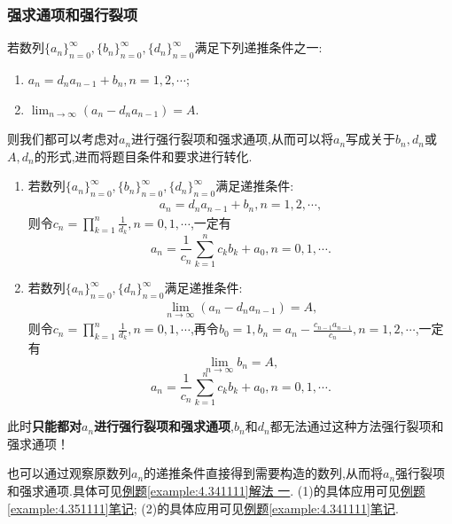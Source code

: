 \documentclass[../../main.tex]{subfiles}%
\begin{document}
\subsubsection{强求通项和强行裂项}

若数列\(\{ a_n \}_{n = 0}^{\infty}, \{ b_n \}_{n = 0}^{\infty}, \{ d_n \}_{n = 0}^{\infty}\)满足下列递推条件之一:
\begin{enumerate}
\item \(a_n = d_na_{n - 1} + b_n, n = 1, 2, \cdots\);
\item \(\lim_{n\rightarrow \infty}(a_n - d_na_{n - 1}) = A\).
\end{enumerate}
则我们都可以考虑对\(a_n\)进行强行裂项和强求通项,从而可以将\(a_n\)写成关于\(b_n, d_n\)或\(A, d_n\)的形式,进而将题目条件和要求进行转化.


\begin{proposition}[强求通项和强行裂项]\label{proposition:强求通项和强行裂项}
\begin{enumerate}[(1)]
\item 若数列\(\{ a_n \}_{n = 0}^{\infty}, \{ b_n \}_{n = 0}^{\infty}, \{ d_n \}_{n = 0}^{\infty}\)满足递推条件:
\begin{align}\label{proposition4.8-0.1}
a_n = d_na_{n - 1} + b_n, n = 1, 2, \cdots,  
\end{align}
则令\(c_n = \prod_{k = 1}^n{\frac{1}{d_k}}, n = 0, 1, \cdots\),一定有
\[
a_n = \frac{1}{c_n}\sum_{k = 1}^n{c_kb_k} + a_0, n = 0, 1, \cdots.
\]

\item 若数列\(\{ a_n \}_{n = 0}^{\infty}, \{ d_n \}_{n = 0}^{\infty}\)满足递推条件:
\begin{align}\label{proposition4.8-0.2}
\lim_{n\rightarrow \infty}(a_n - d_na_{n - 1}) = A,  
\end{align}
则令\(c_n = \prod_{k = 1}^n{\frac{1}{d_k}}, n = 0, 1, \cdots\),再令\(b_0 = 1, b_n = a_n - \frac{c_{n - 1}a_{n - 1}}{c_n}, n = 1, 2, \cdots\),一定有
\[
\lim_{n\rightarrow \infty}b_n = A,
\]
\[
a_n = \frac{1}{c_n}\sum_{k = 1}^n{c_kb_k} + a_0, n = 0, 1, \cdots.
\]
\end{enumerate}
\end{proposition}
\begin{remark}
此时\textbf{只能都对\(a_n\)进行强行裂项和强求通项},\(b_n\)和\(d_n\)都无法通过这种方法强行裂项和强求通项！
\end{remark}
\begin{note}
也可以通过观察原数列$a_n$的递推条件直接得到需要构造的数列,从而将$a_n$强行裂项和强求通项.具体可见\hyperref[example:4.341111]{例题\ref{example:4.341111}解法
一}.
(1)的具体应用可见\hyperlink{递推条件是等式形式的待定数列法}{例题\ref{example:4.351111}笔记};
(2)的具体应用可见\hyperlink{递推条件是极限形式的待定数列法}{例题\ref{example:4.341111}笔记}.
\end{note}
\end{document}

